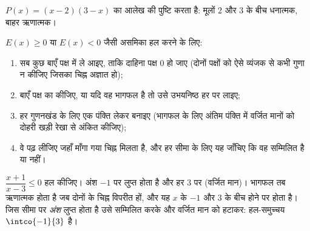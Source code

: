 \begin{omfigure}

{\small $P(x) = (x-2)(3-x)$ का आलेख  की पुष्टि करता है: मूलों $2$ और $3$
के बीच धनात्मक, बाहर ऋणात्मक।}
\end{omfigure}

\begin{method}\label{met:g10:algebra:signtable}
$E(x) \geq 0$ या $E(x) < 0$ जैसी असमिका हल करने के लिए:
\begin{enumerate}
  \item सब कुछ बाएँ पक्ष में ले आइए, ताकि दाहिना पक्ष $0$ हो जाए (दोनों
        पक्षों को ऐसे व्यंजक से कभी गुणा न कीजिए जिसका चिह्न अज्ञात हो);
  \item बाएँ पक्ष का  कीजिए, या यदि वह भागफल है तो उसे उभयनिष्ठ हर
        पर लाइए;
  \item हर गुणनखंड के लिए एक पंक्ति लेकर  बनाइए (भागफल के लिए
        अंतिम पंक्ति में वर्जित मानों को दोहरी खड़ी रेखा से अंकित कीजिए);
  \item वे  पढ़ लीजिए जहाँ माँगा गया चिह्न मिलता है, और हर सीमा के
        लिए यह जाँचिए कि वह सम्मिलित है या नहीं।
\end{enumerate}
\end{method}

\begin{example}\label{ex:g10:algebra:quotientineq}
$\dfrac{x + 1}{x - 3} \leq 0$ हल कीजिए। अंश $-1$ पर लुप्त होता है और हर $3$ पर (वर्जित मान)।
भागफल तब ऋणात्मक होता है जब दोनों के चिह्न विपरीत हों, और यह $x$ के
$-1$ और $3$ के बीच होने पर होता है। जिस सीमा पर \emph{अंश} लुप्त होता
है उसे सम्मिलित करके और वर्जित मान को हटाकर: हल-समुच्चय $\intco{-1}{3}$ है।
\end{example}

